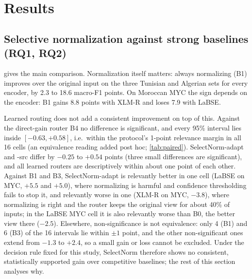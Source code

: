 \section{Results}
\label{sec:results}

\begin{table}[t]
\centering\small\setlength{\tabcolsep}{4.5pt}

\caption{Macro-F1 ($\lambda=0$, mean of five seeds), classifier trained on Arabic script only; two encoders per panel. Bold: best deployable system per column. Shaded: SelectNorm-adapt, the protocol's primary system. $^{\triangledown}$/$^{\blacktriangle}$: the baseline is significantly worse/better than SelectNorm-adapt (paired bootstrap, Holm-corrected $p<0.05$ over the protocol's 20 comparisons per encoder; tested only for B0, B1, B3, B4 and SelectNorm-src). R always runs both passes; B6 uses test labels.}
\label{tab:main}
\end{table}

\subsection{Selective normalization against strong baselines (RQ1, RQ2)}
\label{sec:main-results}
 gives the main comparison. Normalization itself matters: always normalizing (B1) improves over the original input on the three Tunisian and Algerian sets for every encoder, by 2.3 to 18.6 macro-F1 points. On Moroccan MYC the sign depends on the encoder: B1 gains 8.8 points with XLM-R and loses 7.9 with LaBSE.

Learned routing does not add a consistent improvement on top of this. Against the direct-gain router B4 no difference is significant, and every 95\% interval lies inside $[-0.63,+0.58]$, i.e.\ within the protocol's 1-point relevance margin in all 16 cells (an equivalence reading added post hoc; \cref{tab:paired}). SelectNorm-adapt and -src differ by $-0.25$ to $+0.54$ points (three small differences are significant), and all learned routers are descriptively within about one point of each other. Against B1 and B3, SelectNorm-adapt is relevantly better in one cell (LaBSE on MYC, $+5.5$ and $+5.0$), where normalizing is harmful and confidence thresholding fails to stop it, and relevantly worse in one (XLM-R on MYC, $-3.8$), where normalizing is right and the router keeps the original view for about 40\% of inputs; in the LaBSE MYC cell it is also relevantly worse than B0, the better view there ($-2.5$). Elsewhere, non-significance is not equivalence: only 4 (B1) and 6 (B3) of the 16 intervals lie within $\pm1$ point, and the other non-significant ones extend from $-1.3$ to $+2.4$, so a small gain or loss cannot be excluded. Under the decision rule fixed for this study, SelectNorm therefore shows no consistent, statistically supported gain over competitive baselines; the rest of this section analyses why.

